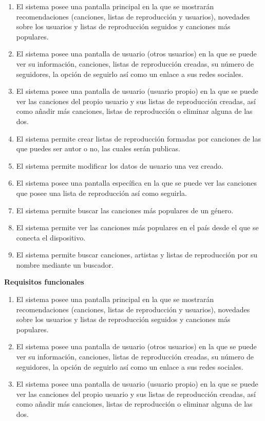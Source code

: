 \documentclass[12pt]{article}%
\begin{document}
\begin{enumerate}
	\item  El sistema posee una pantalla principal en la que se mostrar\'an recomendaciones (canciones, listas de reproducci\'on y usuarios), novedades sobre los usuarios y listas de reproducci\'on seguidos y canciones m\'as populares. 
	\item  El sistema posee una pantalla de usuario (otros usuarios) en la que se puede ver su informaci\'on, canciones, listas de reproducci\'on creadas, su n\'umero de seguidores, la opci\'on de seguirlo as\'i como un enlace a sus redes sociales.
	\item  El sistema posee una pantalla de usuario (usuario propio) en la que se puede ver las canciones del propio usuario y sus listas de reproducci\'on creadas, as\'i como a\~nadir m\'as canciones, listas de reproducci\'on o eliminar alguna de las dos.
	
	\item  El sistema permite crear listas de reproducci\'on formadas por canciones de las que puedes ser autor o no, las cuales ser\'an publicas.
	\item  El sistema permite modificar los datos de usuario una vez creado.
	\item  El sistema posee una pantalla espec\'ifica en la que se puede ver las canciones que posee una lista de reproducci\'on as\'i como seguirla.
	\item  El sistema permite buscar las canciones m\'as populares de un g\'enero.
	\item  El sistema permite ver las canciones m\'as populares en el pa\'is desde el que se conecta el dispositivo.
	\item  El sistema permite buscar canciones, artistas y listas de reproducci\'on por su nombre mediante un buscador.
\end{enumerate}

\textbf{Requisitos funcionales}
\begin{enumerate}
	\item El sistema posee una pantalla principal en la que se mostrar\'an recomendaciones (canciones, listas de reproducci\'on y usuarios), novedades sobre los usuarios y listas de reproducci\'on seguidos y canciones m\'as populares. 
	\item El sistema posee una pantalla de usuario (otros usuarios) en la que se puede ver su informaci\'on, canciones, listas de reproducci\'on creadas, su n\'umero de seguidores, la opci\'on de seguirlo as\'i como un enlace a sus redes sociales.
	\item El sistema posee una pantalla de usuario (usuario propio) en la que se puede ver las canciones del propio usuario y sus listas de reproducci\'on creadas, as\'i como a\~nadir m\'as canciones, listas de reproducci\'on o eliminar alguna de las dos.
\end{enumerate}
\end{document}
